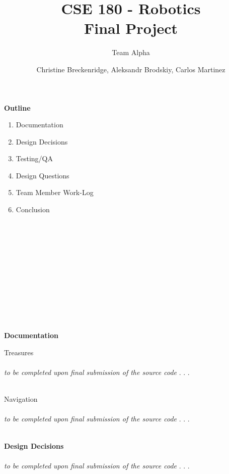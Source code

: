 \documentclass[12pt]{article}
\title{CSE 180 - Robotics \\ Final Project}
\subtitle{Team Alpha}
\author{Christine Breckenridge, Aleksandr Brodskiy, Carlos Martinez}
\begin{document}
\maketitle
{\setlength{\parindent}{0cm}
\textbf{Outline}
\begin{enumerate}  
\item Documentation
\item Design Decisions
\item Testing/QA
\item Design Questions
\item Team Member Work-Log
\item Conclusion\\\\\\\\\\\\\\\\\\\\\\\\
\end{enumerate} 
}
{\setlength{\parindent}{0cm}
\textbf{Documentation} \\
\begin{center}Treasures\end{center}
\paragraph{} \textit{to be completed upon final submission of the source code} . . . \\\\
\begin{center}Navigation\end{center}
\paragraph{} \textit{to be completed upon final submission of the source code} . . . \\\\
}
{\setlength{\parindent}{0cm}
\textbf{Design Decisions} \\
\paragraph{} \textit{to be completed upon final submission of the source code} . . . \\\\
}
\end{document}
